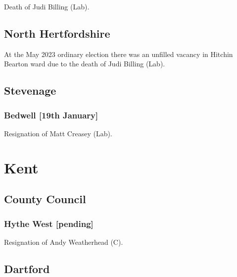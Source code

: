 \documentclass[a4paper,openany]{book}
\begin{document}
\begin{resultsiii}

Death of Judi Billing (Lab).

\subsection*{North Hertfordshire}

At the May 2023 ordinary election there was an unfilled vacancy in Hitchin Bearton ward due to the death of Judi Billing (Lab).%

\subsection*{Stevenage}

\subsubsection*{Bedwell \hspace*{\fill}\nolinebreak[1]%
	\enspace\hspace*{\fill}
	[19th January]}


Resignation of Matt Creasey (Lab).

\section{Kent}

\subsection*{County Council}

\subsubsection*{Hythe West \hspace*{\fill}\nolinebreak[1]%
	\enspace\hspace*{\fill}
	[pending]}


Resignation of Andy Weatherhead (C).

\subsection*{Dartford}


\end{resultsiii}
\end{document}
